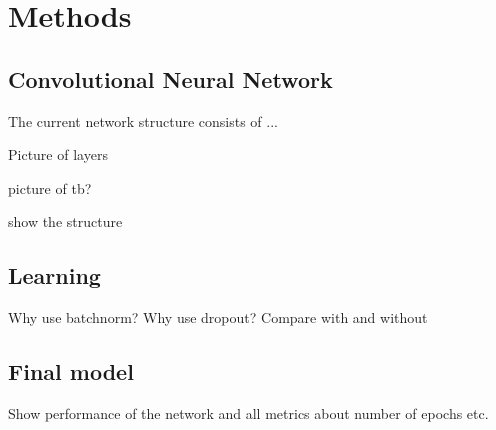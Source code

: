 \documentclass[main.tex]{subfiles}
\begin{document}
\chapter{Methods}
\section{Convolutional Neural Network}
The current network structure consists of ...

Picture of layers

picture of tb?

show the structure


\section{Learning}
Why use batchnorm?
Why use dropout?
Compare with and without

\section{Final model}
Show performance of the network and all metrics about number of epochs etc.
\end{document}
